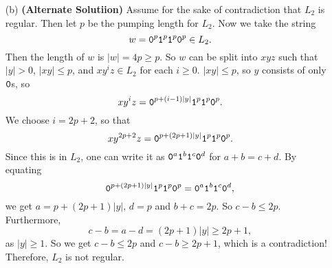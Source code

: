 \documentclass{article}
\begin{document}
\begin{enumerate}[(a)]
\item [(b)] \textbf{(Alternate Solutiion)} Assume for the sake of contradiction that \(L_2\) is regular. Then let \(p\) be the pumping length for \(L_2\). Now we take the string 
\[ w = \texttt{0}^{p} \texttt{1} ^p \texttt{1} ^p \texttt{0}^p \in L_2. \]
Then the length of \(w\) is \(|w| = 4p \geq p\). So \(w\) can be split into \(xyz\) such that \(|y| > 0\), \(|xy| \leq p\), and \(xy^iz \in L_2\) for each \(i \geq 0\). \(|xy| \le p\), so \(y\) consists of only \(\texttt{0}\)s, so 
\[ xy^i z = \texttt{0}^{p + (i-1) |y| } \texttt{1} ^p \texttt{1} ^p \texttt{0}^p . \]
We choose \(i=2p+2\), so that 
\[ xy^{2p+2} z = \texttt{0}^{p + (2p+1) |y| } \texttt{1} ^p \texttt{1} ^p \texttt{0}^p . \]
Since this is in \(L_2\), one can write it as \(\texttt{0}^a\texttt{1}^b\texttt{1}^c \texttt{0}^d\) for \(a+b=c+d\). By equating 
\[ \texttt{0}^{p + (2p+1) |y| } \texttt{1} ^p \texttt{1} ^p \texttt{0}^p = \texttt{0}^a\texttt{1}^b\texttt{1}^c \texttt{0}^d ,  \]
we get \(a= p + (2p+1) |y|\), \(d = p\) and \(b+c=2p\). So \(c-b \le 2p\). Furthermore, 
\[ c-b = a-d =  (2p+1) |y| \ge 2p+1 ,  \]
as \(|y| \ge 1\). So we get \(c-b \le 2p\) and \(c-b \ge 2p+1\), which is a contradiction! Therefore, \(L_2\) is not regular. 

\end{enumerate}
\end{document}

